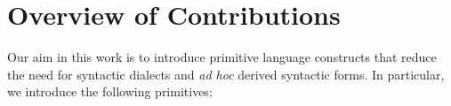 \section{Overview of Contributions}\label{sec:contributions}
Our aim in this work is to introduce primitive language constructs that reduce the need for syntactic dialects and \emph{ad hoc} derived syntactic forms. In particular, we introduce the following primitives:


